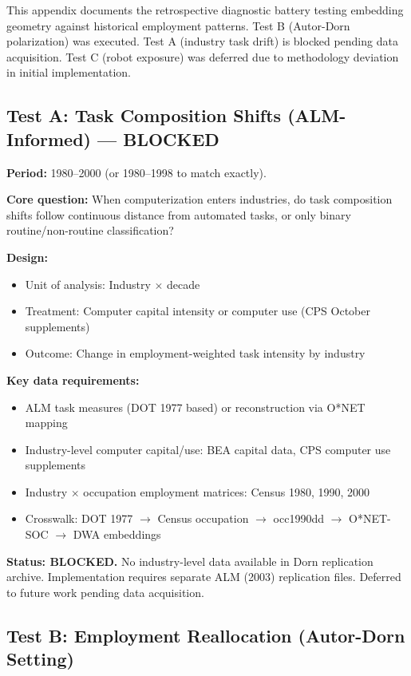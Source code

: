 \documentclass[12pt]{article}
\begin{document}
This appendix documents the retrospective diagnostic battery testing embedding geometry against historical employment patterns. Test B (Autor-Dorn polarization) was executed. Test A (industry task drift) is blocked pending data acquisition. Test C (robot exposure) was deferred due to methodology deviation in initial implementation.


\subsection{Test A: Task Composition Shifts (ALM-Informed) --- BLOCKED}
\label{app:test-a}


\textbf{Period:} 1980--2000 (or 1980--1998 to match \citet{AutorLevyMurnane2003} exactly).

\textbf{Core question:} When computerization enters industries, do task composition shifts follow continuous distance from automated tasks, or only binary routine/non-routine classification?

\textbf{Design:}
\begin{itemize}
    \item Unit of analysis: Industry $\times$ decade
    \item Treatment: Computer capital intensity or computer use (CPS October supplements)
    \item Outcome: Change in employment-weighted task intensity by industry
\end{itemize}

\textbf{Key data requirements:}
\begin{itemize}
    \item ALM task measures (DOT 1977 based) or reconstruction via O*NET mapping
    \item Industry-level computer capital/use: BEA capital data, CPS computer use supplements
    \item Industry $\times$ occupation employment matrices: Census 1980, 1990, 2000
    \item Crosswalk: DOT 1977 $\to$ Census occupation $\to$ occ1990dd $\to$ O*NET-SOC $\to$ DWA embeddings
\end{itemize}

\textbf{Status: BLOCKED.} No industry-level data available in Dorn replication archive. Implementation requires separate ALM (2003) replication files. Deferred to future work pending data acquisition.


\subsection{Test B: Employment Reallocation (Autor-Dorn Setting)}
\label{app:test-b}
\end{document}
